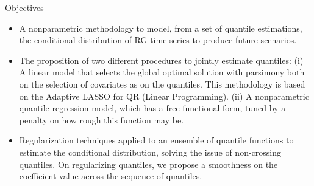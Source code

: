 \begin{frame}{Objectives}
	\begin{itemize}
		\item A nonparametric methodology to model, from a set of quantile estimations, the conditional distribution of RG time series to produce future scenarios.
		
		\item The proposition of two different procedures to jointly estimate quantiles: (i) A linear model that selects the global optimal solution with parsimony both on the selection of covariates as on the quantiles. This methodology is based on the Adaptive LASSO for QR (Linear Programming). (ii) A nonparametric quantile regression model, which has a free functional form, tuned by a penalty on how rough this function may be. 
		
		\item Regularization techniques applied to an ensemble of quantile functions to estimate the conditional distribution, solving the issue of non-crossing quantiles. On regularizing quantiles, we propose a smoothness on the coefficient value across the sequence of quantiles.
		
	\end{itemize}
	
\end{frame}

